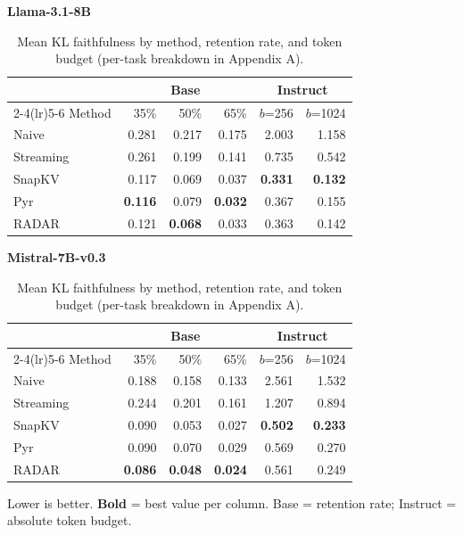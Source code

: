 \documentclass[10pt,letterpaper]{article}
\begin{document}
\begin{table}[H]
\centering
\small
\captionsetup{justification=centering}
\caption{Mean KL faithfulness by method, retention rate, and token budget (per-task breakdown in Appendix A).}
\label{tab:t3}
\begin{minipage}[t]{0.49\textwidth}
\centering
\textbf{Llama-3.1-8B}\\[0.4em]
\begin{tabular}{@{}lrrrrr@{}}
\toprule
& \multicolumn{3}{c}{Base} & \multicolumn{2}{c}{Instruct}\\
\cmidrule(lr){2-4}\cmidrule(lr){5-6}
Method & 35\% & 50\% & 65\% & $b$=256 & $b$=1024\\
\midrule
Naive      & 0.281 & 0.217 & 0.175 & 2.003 & 1.158\\
Streaming  & 0.261 & 0.199 & 0.141 & 0.735 & 0.542\\
SnapKV     & 0.117 & 0.069 & 0.037 & \textbf{0.331} & \textbf{0.132}\\
Pyr        & \textbf{0.116} & 0.079 & \textbf{0.032} & 0.367 & 0.155\\
RADAR      & 0.121 & \textbf{0.068} & 0.033 & 0.363 & 0.142\\
\bottomrule
\end{tabular}
\end{minipage}%
\hfill
\begin{minipage}[t]{0.49\textwidth}
\centering
\textbf{Mistral-7B-v0.3}\\[0.4em]
\begin{tabular}{@{}lrrrrr@{}}
\toprule
& \multicolumn{3}{c}{Base} & \multicolumn{2}{c}{Instruct}\\
\cmidrule(lr){2-4}\cmidrule(lr){5-6}
Method & 35\% & 50\% & 65\% & $b$=256 & $b$=1024\\
\midrule
Naive      & 0.188 & 0.158 & 0.133 & 2.561 & 1.532\\
Streaming  & 0.244 & 0.201 & 0.161 & 1.207 & 0.894\\
SnapKV     & 0.090 & 0.053 & 0.027 & \textbf{0.502} & \textbf{0.233}\\
Pyr        & 0.090 & 0.070 & 0.029 & 0.569 & 0.270\\
RADAR      & \textbf{0.086} & \textbf{0.048} & \textbf{0.024} & 0.561 & 0.249\\
\bottomrule
\end{tabular}
\end{minipage}
\par\smallskip
Lower is better. \textbf{Bold} = best value per column. Base = retention rate; Instruct = absolute token budget.
\end{table}
\end{document}
